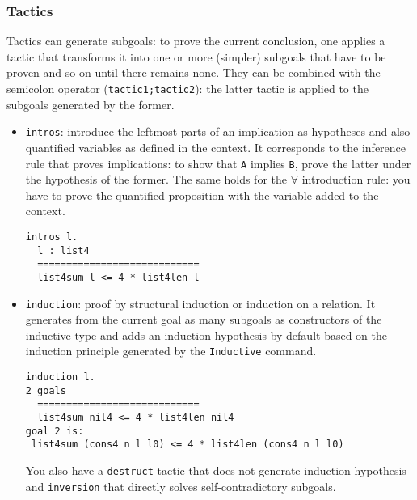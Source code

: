 \documentclass{article}
\begin{document}
        \subsubsection{Tactics}\label{Tactics}
        Tactics can generate subgoals: to prove the current conclusion, one applies a tactic that transforms it into one or more (simpler) subgoals that have to be proven and so on until there remains none. They can be combined with the semicolon operator (\texttt{tactic1;tactic2}): the latter tactic is applied to the subgoals generated by the former.
        \begin{itemize}
            \item \texttt{intros}: introduce the leftmost parts of an implication as hypotheses and also quantified variables as defined in the context. It corresponds to the inference rule that proves implications: to show that \texttt{A} implies \texttt{B}, prove the latter under the hypothesis of the former. The same holds for the $\forall$ introduction rule: you have to prove the quantified proposition with the variable added to the context. 
            \begin{verbatim}intros l.
  l : list4
  ============================
  list4sum l <= 4 * list4len l\end{verbatim}
            \item \texttt{induction}: proof by structural induction or induction on a relation. It generates from the current goal as many subgoals as constructors of the inductive type and adds an induction hypothesis by default based on the induction principle generated by the \texttt{Inductive} command.
            \begin{verbatim}induction l.
2 goals
  ============================
  list4sum nil4 <= 4 * list4len nil4
goal 2 is:
 list4sum (cons4 n l l0) <= 4 * list4len (cons4 n l l0)\end{verbatim}
            You also have a \texttt{destruct} tactic that does not generate induction hypothesis and \texttt{inversion} that directly solves self-contradictory subgoals.
            

\end{itemize}
\end{document}
